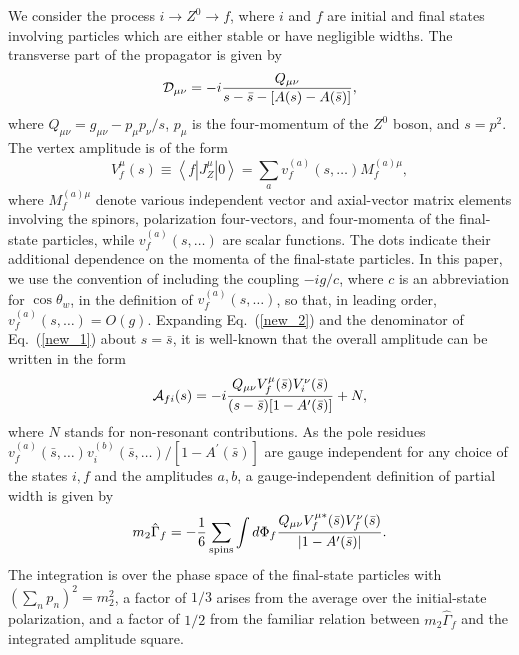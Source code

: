 \documentclass[a4paper,12pt]{article}
\begin{document}
We consider the process $i\to Z^0\to f$, where $i$ and $f$ are
initial and final states involving particles which are either stable or have 
negligible widths.
The transverse part of the propagator is given by 
\begin{equation}
\label{new_1}
{\cal D}_{\mu\nu}=-i\frac{Q_{\mu\nu}}{s-\bar s-[A(s)-A(\bar s)]}, 
\end{equation}
where $Q_{\mu\nu}=g_{\mu\nu}-p_\mu p_\nu/s$, $p_\mu$ is the four-momentum of
the $Z^0$ boson, and $s=p^2$.
The vertex amplitude is of the form 
\begin{equation}
\label{new_2}
V_f^\mu(s)\equiv\left\langle f\left|J^\mu_Z\right|0\right\rangle
=\sum_av^{(a)}_f(s,\dots)M^{(a)\mu}_f,
\end{equation}
where $M^{(a)\mu}_f$ denote various independent vector and axial-vector matrix
elements involving the spinors, polarization four-vectors, and four-momenta of
the final-state particles, while $v^{(a)}_f(s,\dots)$ are scalar functions.
The dots indicate their additional dependence on the momenta of the 
final-state particles. 
In this paper, we use the convention of including the coupling $-ig/c$, where
$c$ is an abbreviation for $\cos\theta_w$, in the definition of
$v^{(a)}_f(s,\dots)$, so that, in leading order, $v^{(a)}_f(s,\dots)=O(g)$.
Expanding Eq.~(\ref{new_2}) and the denominator of Eq.~(\ref{new_1}) about
$s=\bar s$, it is well-known \cite{zmass} that the overall amplitude can be written in the
form 
\begin{equation}\label{new_3}
{\cal A}_{fi}(s)=-i\frac{Q_{\mu\nu}V_f^\mu(\bar s)V_i^\nu(\bar s)}
{(s-\bar s)[1-A^\prime(\bar s)]}+N,
\end{equation}
where $N$ stands for non-resonant contributions. 
As the pole residues
$v^{(a)}_f(\bar s,\dots)v^{(b)}_i(\bar s,\dots)/[1-A^\prime(\bar s)]$ are
gauge independent for any choice of the states $i,f$ and the amplitudes $a,b$,
a gauge-independent definition of partial width is given by 
\begin{equation}
\label{new_4}
m_2\hat\Gamma_f=-{1\over 6}\sum_{\rm spins}\int d\Phi_f 
\frac{Q_{\mu\nu}V_f^{\mu*}(\bar s)V_f^\nu(\bar s)}
{\left|1-A^\prime(\bar s)\right|}.
\end{equation}
The integration is over the phase space of the final-state particles with
$(\sum_n p_n)^2=m^2_2$, a factor of $1/3$ arises from the average over the
initial-state polarization, and a factor of $1/2$ from the familiar relation
between $m_2\hat\Gamma_f$ and the integrated amplitude square. 
\end{document}
